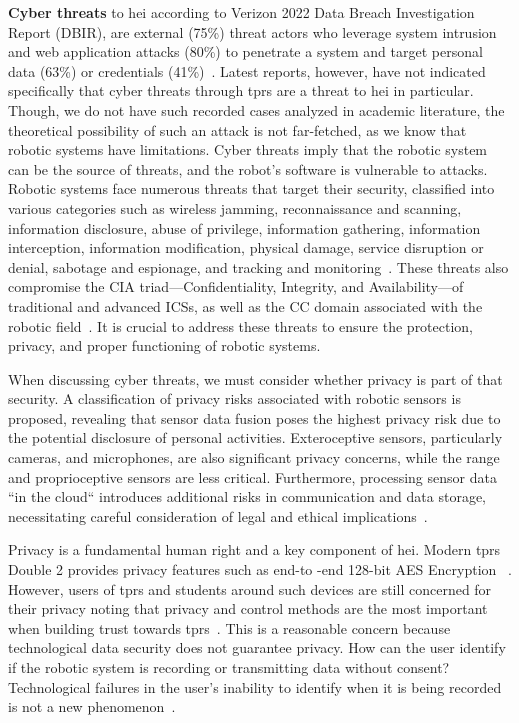 \textbf{Cyber threats} to \ac{hei} according to Verizon 2022 Data Breach Investigation Report (DBIR), are external (75\%) threat actors
who leverage system intrusion and web application attacks
(80\%) to penetrate a system and target personal data (63\%) or credentials (41\%)~\cite[57]{dbir_2022}. Latest reports, however, have not
indicated specifically that cyber threats through \ac{tprs} are a threat to \ac{hei} in particular. Though, we do not
have such recorded cases analyzed in academic literature, the theoretical possibility of such an attack is not far-fetched, as we
know that robotic systems have limitations. Cyber threats imply that the robotic system can be the source of threats, and the robot's software is vulnerable to attacks. Robotic systems face numerous threats that target their security, classified into various categories such as wireless jamming,
reconnaissance and scanning, information disclosure, abuse of privilege, information gathering, information interception, information
modification, physical damage, service disruption or denial, sabotage and espionage, and tracking and monitoring~\cite[122]{robotics_cyber_security_2022}. These threats also
compromise the CIA triad—Confidentiality, Integrity, and Availability—of traditional and advanced \ac{ICSs}, as
well as the \ac{CC} domain associated with the robotic field~\cite[116]{robotics_cyber_security_2022}. It is crucial to address these threats to ensure the protection, privacy, and proper functioning of robotic systems.

When discussing cyber threats, we must consider whether privacy is part of that security. A classification of privacy risks
associated with robotic sensors is proposed, revealing that sensor data fusion poses the highest privacy risk due to the potential
disclosure of personal activities. Exteroceptive sensors, particularly cameras, and microphones, are also significant privacy concerns,
while the range and proprioceptive sensors are less critical. Furthermore, processing sensor data ``in the cloud`` introduces
additional risks in communication and data storage, necessitating careful consideration of legal and ethical implications~\cite[82-84]{cyber_sec_robotics_privacy_safety_2017}.

Privacy is a fundamental human right and a key component of \ac{hei}. Modern \ac{tprs} Double 2 provides privacy features such as end-to
-end 128-bit AES Encryption
~\cite[544]{telepresence_robots_in_classroom_2019}. However, users of \ac{tprs} and students around such devices are still concerned for
their privacy noting that privacy and control methods are the
most important when building trust towards \ac{tprs}~\cite[59]{telepresence_perspective_psychology_educational_2022}.
This is a reasonable concern because technological data security does not guarantee privacy. How can the user identify if the robotic
system is recording or transmitting data without consent? Technological failures in the user's inability to identify when it is being recorded is not a new phenomenon~\cite[]{is_my_phone_listening_2019}.

